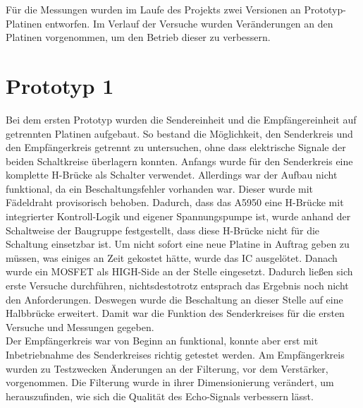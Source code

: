 Für die Messungen wurden im Laufe des Projekts zwei Versionen an Prototyp-Platinen entworfen. Im Verlauf der Versuche wurden Veränderungen an den Platinen vorgenommen, um den Betrieb dieser zu verbessern. 
\section{Prototyp 1}
Bei dem ersten Prototyp wurden die Sendereinheit und die Empfängereinheit auf getrennten Platinen aufgebaut. So bestand die Möglichkeit, den Senderkreis und den Empfängerkreis getrennt zu untersuchen, ohne dass elektrische Signale der beiden Schaltkreise überlagern konnten. Anfangs wurde für den Senderkreis eine komplette H-Brücke als Schalter verwendet. Allerdings war der Aufbau nicht funktional, da ein Beschaltungsfehler vorhanden war. Dieser wurde mit Fädeldraht provisorisch behoben.  Dadurch, dass das A5950 eine H-Brücke mit integrierter Kontroll-Logik und eigener Spannungspumpe ist, wurde anhand der Schaltweise der Baugruppe festgestellt, dass diese H-Brücke nicht für die Schaltung einsetzbar ist. Um nicht sofort eine neue Platine in Auftrag geben zu müssen, was einiges an Zeit gekostet hätte, wurde das IC ausgelötet. Danach wurde ein MOSFET als HIGH-Side an der Stelle eingesetzt. Dadurch ließen sich erste Versuche durchführen, nichtsdestotrotz entsprach das Ergebnis noch nicht den Anforderungen. Deswegen wurde die Beschaltung an dieser Stelle auf eine Halbbrücke erweitert. Damit war die Funktion des Senderkreises für die ersten Versuche und Messungen gegeben.\\
Der Empfängerkreis war von Beginn an funktional, konnte aber erst mit Inbetriebnahme des Senderkreises richtig getestet werden. Am Empfängerkreis wurden zu Testzwecken Änderungen an der Filterung, vor dem Verstärker, vorgenommen. Die Filterung wurde in ihrer Dimensionierung verändert, um herauszufinden, wie sich die Qualität des Echo-Signals verbessern lässt.\\

